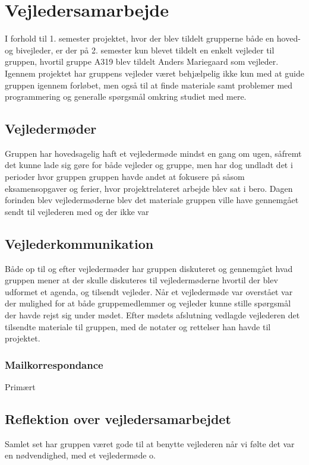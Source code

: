 \chapter{Vejledersamarbejde}\label{Vejldersamarbejde}
I forhold til 1. semester projektet, hvor der blev tildelt grupperne både en hoved- og bivejleder, er der på 2. semester kun blevet tildelt en enkelt vejleder til gruppen, hvortil gruppe A319 blev tildelt Anders Mariegaard som vejleder. Igennem projektet har gruppens vejleder været behjælpelig ikke kun med at guide gruppen igennem forløbet, men også til at finde materiale samt problemer med programmering og generalle spørgsmål omkring studiet med mere. 

\section{Vejledermøder}\label{Vejledermoeder}
Gruppen har hovedsagelig haft et vejledermøde mindst en gang om ugen, såfremt det kunne lade sig gøre for både vejleder og gruppe, men har dog undladt det i perioder hvor gruppen gruppen havde andet at fokusere på såsom eksamensopgaver og ferier, hvor projektrelateret arbejde blev sat i bero. Dagen forinden blev vejledermøderne blev det materiale gruppen ville have gennemgået sendt til vejlederen med og der ikke var 

\section{Vejlederkommunikation}\label{Vejlederkommunikation}
Både op til og efter vejledermøder har gruppen diskuteret og gennemgået hvad gruppen mener at der skulle diskuteres til vejledermøderne hvortil der blev udformet et agenda, og tilsendt vejleder. Når et vejledermøde var overstået var der mulighed for at både gruppemedlemmer og vejleder kunne stille spørgsmål der havde rejst sig under mødet. Efter mødets afslutning vedlagde vejlederen det tilsendte materiale til gruppen, med de notater og rettelser han havde til projektet. 


\subsection{Mailkorrespondance}\label{Mailkorrespondance}
Primært 

\section{Reflektion over vejledersamarbejdet}\label{Reflektion-over-vejledersamarbejdet}
Samlet set har gruppen været gode til at benytte vejlederen når vi følte det var en nødvendighed, med et vejledermøde o. 